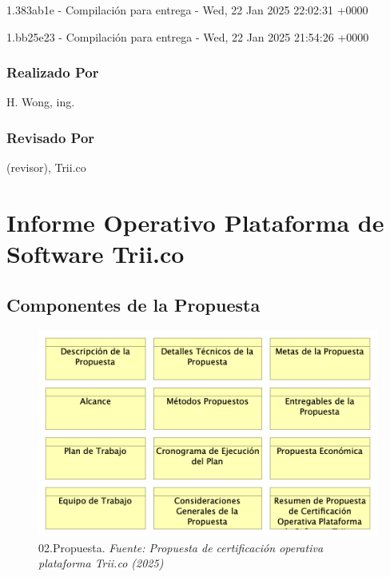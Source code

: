 \documentclass[
  paper=a4,
  ,captions=tableheading
]{scrartcl}
\renewenvironment{quote}{\begin{customblockquote}\list{}{\rightmargin=0em\leftmargin=0em}%
\item\relax\color{blockquote-text}\ignorespaces}{\unskip\unskip\endlist\end{customblockquote}}
\begin{document}
1.383ab1e - Compilación para entrega - Wed, 22 Jan 2025 22:02:31 +0000

1.bb25e23 - Compilación para entrega - Wed, 22 Jan 2025 21:54:26 +0000

\subsubsection{Realizado Por}\label{sec:realizado-por}

H. Wong, ing.

\subsubsection{Revisado Por}\label{sec:revisado-por}

(revisor), Trii.co

\newpage

\section{Informe Operativo Plataforma de Software
Trii.co}\label{sec:informe-operativo-plataforma-de-software-trii.co}

\subsection{Componentes de la
Propuesta}\label{sec:componentes-de-la-propuesta}

\begin{quote}
\end{quote}

\begin{figure}
\centering
\includegraphics{images/02.Propuesta.png}
\caption{02.Propuesta. \emph{Fuente: Propuesta de certificación
operativa plataforma Trii.co
(2025)}}\label{fig:id-dd2f1c1c1816447380fe900b66faa8bc}
\end{figure}
\end{document}
